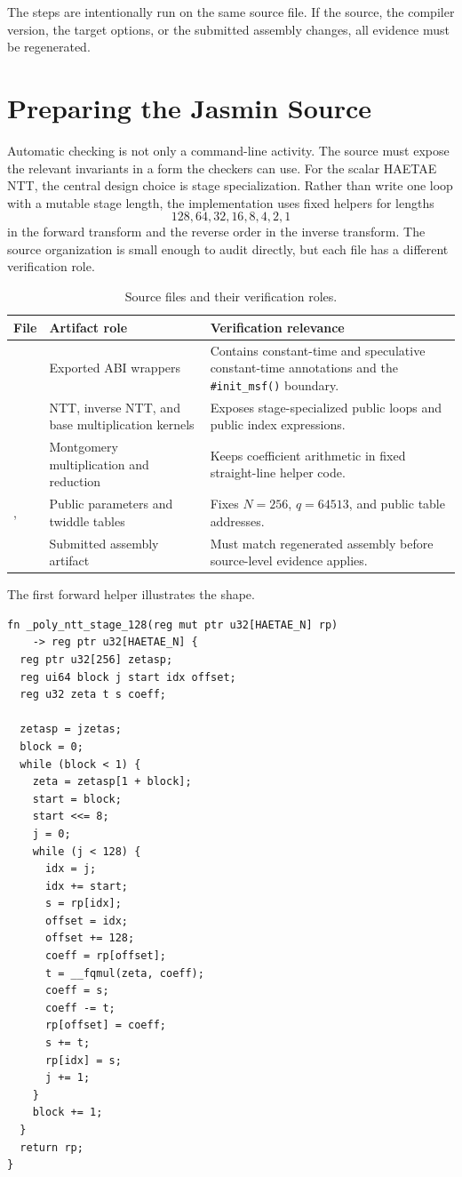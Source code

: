 \documentclass[10pt,twocolumn]{article}
\newcommand{\haetae}{HAETAE}
\newcommand{\ct}{constant-time}
\newcommand{\sct}{speculative constant-time}
\begin{document}
The steps are intentionally run on the same source file.  If the source, the
compiler version, the target options, or the submitted assembly changes, all
evidence must be regenerated.

\section{Preparing the Jasmin Source}

Automatic checking is not only a command-line activity.  The source must expose
the relevant invariants in a form the checkers can use.  For the scalar
\haetae{} NTT, the central design choice is stage specialization.  Rather than
write one loop with a mutable stage length, the implementation uses fixed
helpers for lengths
\[
  128,64,32,16,8,4,2,1
\]
in the forward transform and the reverse order in the inverse transform.  The
source organization is small enough to audit directly, but each file has a
different verification role.

\begin{table}[t]
\centering
\scriptsize
\setlength{\tabcolsep}{3pt}
\begin{tabular}{P{0.25\columnwidth}P{0.30\columnwidth}P{0.35\columnwidth}}
\toprule
File & Artifact role & Verification relevance \tabularnewline
\midrule
{} & Exported ABI wrappers & Contains \ct{} and \sct{}
annotations and the \texttt{\#init\_msf()} boundary. \tabularnewline
{} & NTT, inverse NTT, and base multiplication kernels & Exposes
stage-specialized public loops and public index expressions. \tabularnewline
{} & Montgomery multiplication and reduction & Keeps coefficient
arithmetic in fixed straight-line helper code. \tabularnewline
{},  & Public parameters and twiddle tables &
Fixes \(N=256\), \(q=64513\), and public table addresses. \tabularnewline
{} & Submitted assembly artifact & Must match regenerated assembly
before source-level evidence applies. \tabularnewline
\bottomrule
\end{tabular}
\caption{Source files and their verification roles.}
\label{tab:source-roles}
\end{table}

The first forward helper illustrates the shape.

\begin{lstlisting}[language=Jasmin,caption={Stage-specialized forward helper.},label={lst:stage}]
fn _poly_ntt_stage_128(reg mut ptr u32[HAETAE_N] rp)
    -> reg ptr u32[HAETAE_N] {
  reg ptr u32[256] zetasp;
  reg ui64 block j start idx offset;
  reg u32 zeta t s coeff;

  zetasp = jzetas;
  block = 0;
  while (block < 1) {
    zeta = zetasp[1 + block];
    start = block;
    start <<= 8;
    j = 0;
    while (j < 128) {
      idx = j;
      idx += start;
      s = rp[idx];
      offset = idx;
      offset += 128;
      coeff = rp[offset];
      t = __fqmul(zeta, coeff);
      coeff = s;
      coeff -= t;
      rp[offset] = coeff;
      s += t;
      rp[idx] = s;
      j += 1;
    }
    block += 1;
  }
  return rp;
}
\end{lstlisting}
\end{document}

